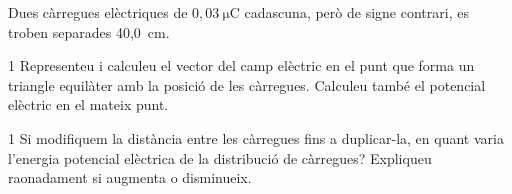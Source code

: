 Dues càrregues elèctriques de $0,03\ \mathrm{\mu C}$ cadascuna, però de signe contrari, es troben separades 40,0~cm.

\begin{apartat}{1}
Representeu i calculeu el vector del camp elèctric en el punt que forma un triangle equilàter amb la posició de les càrregues. Calculeu també el potencial elèctric en el mateix punt.
\end{apartat}

\begin{apartat}{1}
Si modifiquem la distància entre les càrregues fins a duplicar-la, en quant varia l'energia potencial elèctrica de la distribució de càrregues? Expliqueu raonadament si augmenta o disminueix.
\end{apartat}

